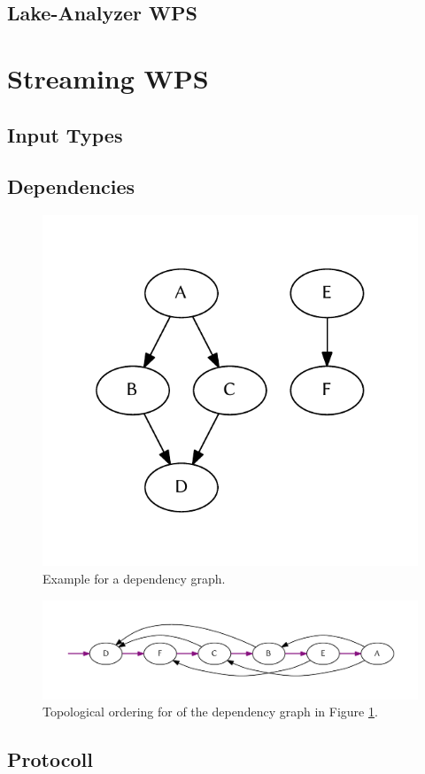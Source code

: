 		\subsection{Lake-Analyzer WPS}
	\section{Streaming WPS}
		\subsection{Input Types}
		\subsection{Dependencies}
		\begin{figure}[!htb]
			\centering
			\includegraphics[width=.4474\textwidth]{figures/unordered-graph.pdf} %
			\caption{\label{fig:graph:unordered} Example for a dependency graph.}
		\end{figure}
		\begin{figure}[!htb]
			\centering
			\includegraphics[width=1\textwidth]{figures/ordered-graph.pdf} %
			\caption{\label{fig:graph:ordered} Topological ordering for of the dependency graph in Figure \ref{fig:graph:unordered}.}
		\end{figure}

		\subsection{Protocoll}
